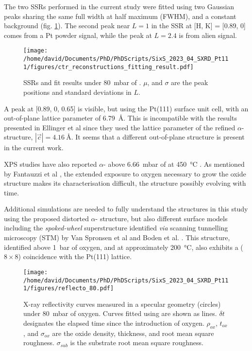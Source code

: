 The two SSRs performed in the current study were fitted using two Gaussian peaks sharing the same full width at half maximum (FWHM), and a constant background (fig. \ref{fig:LScans80Fit}).
The second peak near $L=1$ in the SSR at [H, K] = [0.89, 0] comes from a Pt powder signal, while the peak at $L=2.4$ is from alien signal.

\begin{figure}[!htb]
    \centering
    \texttt{[image: /home/david/Documents/PhD/PhDScripts/SixS\_2023\_04\_SXRD\_Pt111/figures/ctr\_reconstructions\_fitting\_result.pdf]}
    \caption{
        SSRs and fit results under \qty{80}{\milli\bar} of .
        $\mu$, and $\sigma$ are the peak positions and standard deviations in $L$.
    }
    \label{fig:LScans80Fit}
\end{figure}

A peak at [0.89, 0, 0.65] is visible, but using the Pt(111) surface unit cell, with an out-of-plane lattice parameter of \qty{6.79}{\angstrom}.
This is incompatible with the results presented in Ellinger et al \parencite*{Ellinger2008} since they used the lattice parameter of the refined $\alpha$- structure, $|\vec{c}|=\qty{4.16}{\angstrom}$.
It seems that a different out-of-plane structure is present in the current work.

XPS studies have also reported $\alpha$- above \qty{6.66}{\milli\bar} of  at \qty{450}{\degreeCelsius} \parencite{Miller2011, Miller2014}.
As mentioned by Fantauzzi et al \parencite*{Fantauzzi2017}, the extended exposure to oxygen necessary to grow the oxide structure makes its characterisation difficult, the structure possibly evolving with time.

Additional simulations are needed to fully understand the structures in this study using the proposed distorted $\alpha$- structure, but also different surface models including the \textit{spoked-wheel} superstructure identified \textit{via} scanning tunnelling microscopy (STM) by Van Spronsen et al \parencite*{VanSpronsen2017} and Boden et al. \parencite*{Boden2022}.
This structure, identified above \qty{1}{\bar} of oxygen, and at approximately \qty{200}{\degreeCelsius}, also exhibits a ($8\times8$) coincidence with the Pt(111) lattice.

\begin{figure}[!htb]
    \centering
    \texttt{[image: /home/david/Documents/PhD/PhDScripts/SixS\_2023\_04\_SXRD\_Pt111/figures/reflecto\_80.pdf]}
    \caption{
    	X-ray reflectivity curves measured in a specular geometry (circles) under \qty{80}{\milli\bar} of oxygen.
    	Curves fitted using  are shown as lines.
        $\delta t$ designates the elapsed time since the introduction of oxygen.
        $\rho_{ox}$, $t_{ox}$, and $\sigma_{ox}$ are the oxide density, thickness, and root mean square roughness.
        $\sigma_{sub}$ is the substrate root mean square roughness.
    }
    \label{fig:Reflecto80}
\end{figure}

